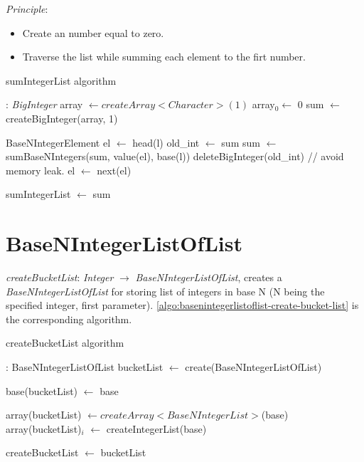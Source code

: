 \documentclass[book, nodocumentinfo]{upmethodology-document}
\begin{document}
\emph{Principle}:
\begin{itemize}
    \item Create an number equal to zero.
    \item Traverse the list while summing each element to the firt number.
\end{itemize}

\begin{algorithm}[H]
    \caption{sumIntegerList algorithm}
    \label{algo:basenintegerlist-sum-integer-list}

    \begin{algorithmic}
         : \emph{BigInteger}
            \State array \(\leftarrow createArray<Character>(1)\)
            \State array\(_0 \leftarrow\) 0
            \State sum \(\leftarrow\) createBigInteger(array, 1)

            \State BaseNIntegerElement el \(\leftarrow\) head(l)
                \State old\_int \(\leftarrow\) sum
                \State sum \(\leftarrow\) sumBaseNIntegers(sum, value(el), base(l))
                \State deleteBigInteger(old\_int) // avoid memory leak.
                \State el \(\leftarrow\) next(el)
            \EndWhile

            \State sumIntegerList \(\leftarrow\) sum
        \EndFunction
    \end{algorithmic}
\end{algorithm}

\section{BaseNIntegerListOfList}

\emph{createBucketList}: \emph{Integer} \(\rightarrow\) \emph{BaseNIntegerListOfList},
creates a \emph{BaseNIntegerListOfList} for storing list of integers in base N (N being the specified integer, first parameter).
\ref{algo:basenintegerlistoflist-create-bucket-list} is the corresponding algorithm.

\begin{algorithm}[H]
    \caption{createBucketList algorithm}
    \label{algo:basenintegerlistoflist-create-bucket-list}

    \begin{algorithmic}
         : BaseNIntegerListOfList
            \State bucketList \(\leftarrow\) create(BaseNIntegerListOfList)

            \State base(bucketList) \(\leftarrow\) base

            \State array(bucketList) \(\leftarrow createArray<BaseNIntegerList>\)(base)
                \State array(bucketList)\(_i\) \(\leftarrow\) createIntegerList(base)
            \EndFor

            \State createBucketList \(\leftarrow\) bucketList
        \EndFunction
    \end{algorithmic}
\end{algorithm}
\end{document}

